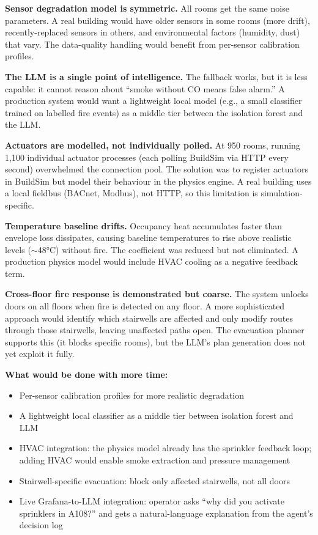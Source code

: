 \documentclass[11pt]{article}
\providecommand{\tightlist}{\setlength{\itemsep}{0pt}\setlength{\parskip}{0pt}}
\begin{document}
\textbf{Sensor degradation model is symmetric.} All rooms get the same noise parameters. A real building would have older sensors in some rooms (more drift), recently-replaced sensors in others, and environmental factors (humidity, dust) that vary. The data-quality handling would benefit from per-sensor calibration profiles.

\textbf{The LLM is a single point of intelligence.} The fallback works, but it is less capable: it cannot reason about ``smoke without CO means false alarm.'' A production system would want a lightweight local model (e.g., a small classifier trained on labelled fire events) as a middle tier between the isolation forest and the LLM.

\textbf{Actuators are modelled, not individually polled.} At 950 rooms, running 1,100 individual actuator processes (each polling BuildSim via HTTP every second) overwhelmed the connection pool. The solution was to register actuators in BuildSim but model their behaviour in the physics engine. A real building uses a local fieldbus (BACnet, Modbus), not HTTP, so this limitation is simulation-specific.

\textbf{Temperature baseline drifts.} Occupancy heat accumulates faster than envelope loss dissipates, causing baseline temperatures to rise above realistic levels ($\sim$48°C) without fire. The coefficient was reduced but not eliminated. A production physics model would include HVAC cooling as a negative feedback term.

\textbf{Cross-floor fire response is demonstrated but coarse.} The system unlocks doors on all floors when fire is detected on any floor. A more sophisticated approach would identify which stairwells are affected and only modify routes through those stairwells, leaving unaffected paths open. The evacuation planner supports this (it blocks specific rooms), but the LLM's plan generation does not yet exploit it fully.

\textbf{What would be done with more time:}
\begin{itemize}\tightlist
  \item Per-sensor calibration profiles for more realistic degradation
  \item A lightweight local classifier as a middle tier between isolation forest and LLM
  \item HVAC integration: the physics model already has the sprinkler feedback loop; adding HVAC would enable smoke extraction and pressure management
  \item Stairwell-specific evacuation: block only affected stairwells, not all doors
  \item Live Grafana-to-LLM integration: operator asks ``why did you activate sprinklers in A108?'' and gets a natural-language explanation from the agent's decision log
\end{itemize}
\end{document}
